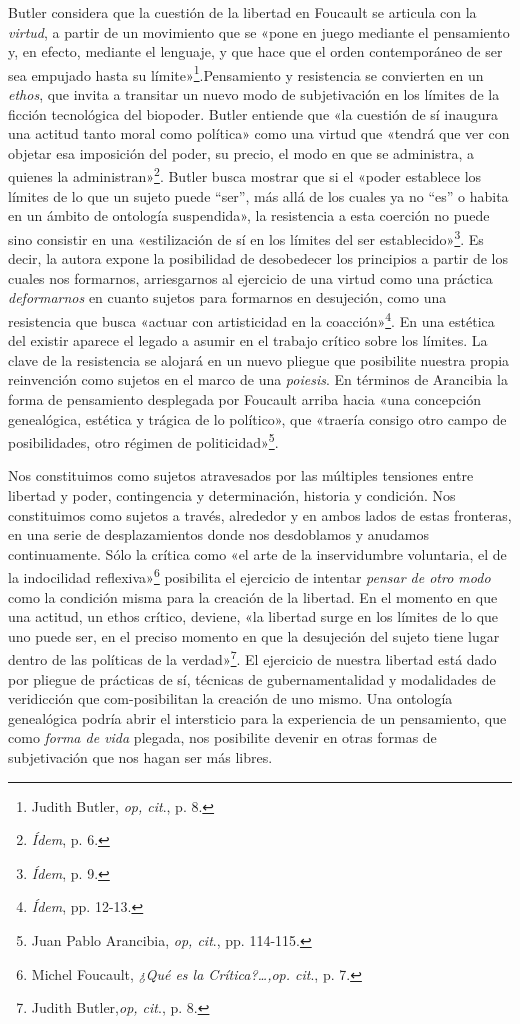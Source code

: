 Butler considera que la cuestión de la libertad en Foucault se articula con la \emph{virtud}, a partir de un movimiento que se «pone en juego mediante el pensamiento y, en efecto, mediante el lenguaje, y que hace que el orden contemporáneo de ser sea empujado hasta su límite»\footnote{Judith Butler, \emph{op, cit}., p. 8.}.Pensamiento y resistencia se convierten en un \emph{ethos}, que invita a transitar un nuevo modo de subjetivación en los límites de la ficción tecnológica del biopoder. Butler entiende que «la cuestión de sí inaugura una actitud tanto moral como política» como una virtud que «tendrá que ver con objetar esa imposición del poder, su precio, el modo en que se administra, a quienes la administran»\footnote{\emph{Ídem}, p. 6.}. Butler busca mostrar que si el «poder establece los límites de lo que un sujeto puede ``ser'', más allá de los cuales ya no ``es'' o habita en un ámbito de ontología suspendida», la resistencia a esta coerción no puede sino consistir en una «estilización de sí en los límites del ser establecido»\footnote{\emph{Ídem}, p. 9.}. Es decir, la autora expone la posibilidad de desobedecer los principios a partir de los cuales nos formarnos, arriesgarnos al ejercicio de una virtud como una práctica \emph{deformarnos} en cuanto sujetos para formarnos en desujeción, como una resistencia que busca «actuar con artisticidad en la coacción»\footnote{\emph{Ídem}, pp. 12-13.}. En una estética del existir aparece el legado a asumir en el trabajo crítico sobre los límites. La clave de la resistencia se alojará en un nuevo pliegue que posibilite nuestra propia reinvención como sujetos en el marco de una \emph{poiesis}. En términos de Arancibia la forma de pensamiento desplegada por Foucault arriba hacia «una concepción genealógica, estética y trágica de lo político», que «traería consigo otro campo de posibilidades, otro régimen de politicidad»\footnote{Juan Pablo Arancibia, \emph{op, cit}., pp. 114-115.}.

Nos constituimos como sujetos atravesados por las múltiples tensiones entre libertad y poder, contingencia y determinación, historia y condición. Nos constituimos como sujetos a través, alrededor y en ambos lados de estas fronteras, en una serie de desplazamientos donde nos desdoblamos y anudamos continuamente. Sólo la crítica como «el arte de la inservidumbre voluntaria, el de la indocilidad reflexiva»\footnote{Michel Foucault, \emph{¿Qué es la Crítica?\ldots,op. cit}., p. 7.} posibilita el ejercicio de intentar \emph{pensar de otro modo} como la condición misma para la creación de la libertad. En el momento en que una actitud, un ethos crítico, deviene, «la libertad surge en los límites de lo que uno puede ser, en el preciso momento en que la desujeción del sujeto tiene lugar dentro de las políticas de la verdad»\footnote{Judith Butler,\emph{op, cit}., p. 8.}. El ejercicio de nuestra libertad está dado por pliegue de prácticas de sí, técnicas de gubernamentalidad y modalidades de veridicción que com-posibilitan la creación de uno mismo. Una ontología genealógica podría abrir el intersticio para la experiencia de un pensamiento, que como \emph{forma de vida} plegada, nos posibilite devenir en otras formas de subjetivación que nos hagan ser más libres.

